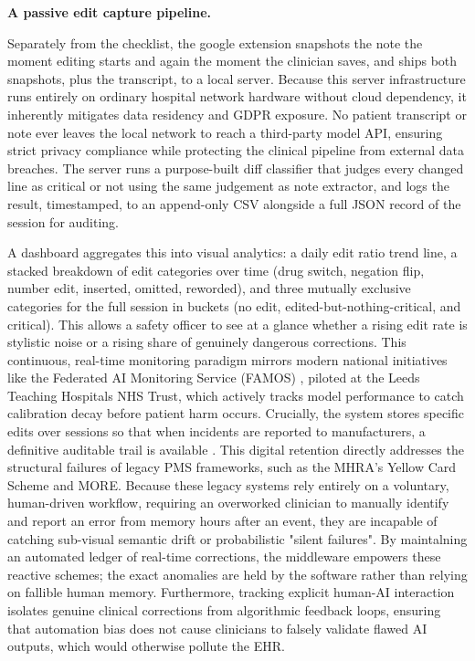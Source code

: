 \documentclass[11pt,a4paper]{article}
\begin{document}
 
 \textbf{A passive edit capture pipeline.}

Separately from the checklist, the google extension snapshots the note the moment editing starts and again the moment the clinician saves, and ships both snapshots, plus the transcript, to a local server. Because this server infrastructure runs entirely on ordinary hospital network hardware without cloud dependency, it inherently mitigates data residency and GDPR exposure. No patient transcript or note ever leaves the local network to reach a third-party model API, ensuring strict privacy compliance while protecting the clinical pipeline from external data breaches. The server runs a purpose-built diff classifier that judges every changed line as critical or not using the same judgement as note extractor, and logs the result, timestamped, to an append-only CSV alongside a full JSON record of the session for auditing. 

A dashboard aggregates this into visual analytics: a daily edit ratio trend line, a stacked breakdown of edit categories over time (drug switch, negation flip, number edit, inserted, omitted, reworded), and three mutually exclusive categories for the full session in buckets (no edit, edited-but-nothing-critical, and critical). This allows a safety officer to see at a glance whether a rising edit rate is stylistic noise or a rising share of genuinely dangerous corrections. This continuous, real-time monitoring paradigm mirrors modern national initiatives like the Federated AI Monitoring Service (FAMOS) \cite{mhra2025} , piloted at the Leeds Teaching Hospitals NHS Trust, which actively tracks model performance to catch calibration decay before patient harm occurs.  
Crucially, the system stores specific edits over sessions so that when incidents are reported to manufacturers, a definitive auditable trail is available . This digital retention directly addresses the structural failures of legacy PMS frameworks, such as the MHRA's Yellow Card Scheme and MORE. Because these legacy systems rely entirely on a voluntary, human-driven workflow, requiring an overworked clinician to manually identify and report an error from memory hours after an event, they are incapable of catching sub-visual semantic drift or probabilistic "silent failures". By maintalning an automated ledger of real-time corrections, the middleware empowers these reactive schemes; the exact anomalies are held by the software rather than relying on fallible human memory. Furthermore, tracking explicit human-AI interaction isolates genuine clinical corrections from algorithmic feedback loops, ensuring that automation bias does not cause clinicians to falsely validate flawed AI outputs, which would otherwise pollute the EHR. 
\end{document}
